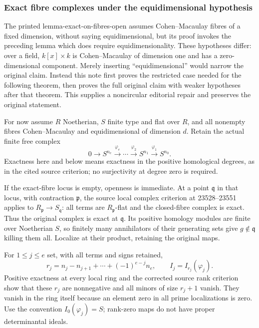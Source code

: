 \subsubsection{Exact fibre complexes under the equidimensional hypothesis}\label{algebra-proof-039-exact-fibre-complexes-under-the-equidimensional-hypothesis}

The printed lemma-\AlgebraIdentifierBreak{}exact-\AlgebraIdentifierBreak{}on-\AlgebraIdentifierBreak{}fibres-\AlgebraIdentifierBreak{}open assumes Cohen--Macaulay fibres of a fixed dimension, without saying equidimensional, but its proof invokes the preceding lemma which does require equidimensionality. These hypotheses differ: over a field, \(k[x]\times k\) is Cohen--Macaulay of dimension one and has a zero-dimensional component. Merely inserting ``equidimensional'' would narrow the original claim. Instead this note first proves the restricted case needed for the following theorem, then proves the full original claim with weaker hypotheses after that theorem. This supplies a noncircular editorial repair and preserves the original statement.

For now assume \(R\) Noetherian, \(S\) finite type and flat over \(R\), and all nonempty fibres Cohen--Macaulay and equidimensional of dimension \(d\). Retain the actual finite free complex \[
0\longrightarrow S^{n_e}\xrightarrow{\varphi_e}\cdots
\xrightarrow{\varphi_2}S^{n_1}\xrightarrow{\varphi_1}S^{n_0}.
\] Exactness here and below means exactness in the positive homological degrees, as in the cited source criterion; no surjectivity at degree zero is required.

If the exact-fibre locus is empty, openness is immediate. At a point \(\mathfrak q\) in that locus, with contraction \(\mathfrak p\), the source local complex criterion at 23528--23551 applies to \(R_{\mathfrak p}\to S_{\mathfrak q}\): all terms are \(R_{\mathfrak p}\)-flat and the closed-fibre complex is exact. Thus the original complex is exact at \(\mathfrak q\). Its positive homology modules are finite over Noetherian \(S\), so finitely many annihilators of their generating sets give \(g\notin\mathfrak q\) killing them all. Localize at their product, retaining the original maps.

For \(1\leq j\leq e\) set, with all terms and signs retained, \[
r_j=n_j-n_{j+1}+\cdots+(-1)^{e-j}n_e,\qquad
I_j=I_{r_j}(\varphi_j).
\] Positive exactness at every local ring and the corrected source rank criterion show that these \(r_j\) are nonnegative and all minors of size \(r_j+1\) vanish. They vanish in the ring itself because an element zero in all prime localizations is zero. Use the convention \(I_0(\varphi_j)=S\); rank-zero maps do not have proper determinantal ideals.

